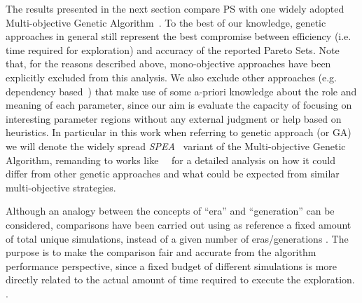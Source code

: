 The results presented in the next section compare PS with one widely
adopted Multi-objective Genetic Algorithm~\cite{knowles_techrep06}. To
the best of our knowledge, genetic approaches in general still
represent the best compromise between efficiency (i.e. time required
for exploration) and accuracy of the reported Pareto Sets.  Note that,
for the reasons described above, mono-objective approaches have been
explicitly excluded from this analysis.  We also exclude other
approaches (e.g.  dependency based~\cite{givargis_tvlsi02}) that make
use of some a-priori knowledge about the role and meaning of each
parameter, since our aim is evaluate the capacity of focusing on
interesting parameter regions without any external judgment or help
based on heuristics.  In particular in this work when referring to
genetic approach (or GA) we will denote the widely spread 
\emph{SPEA}~\cite{zitzler_eurogen01} variant of the Multi-objective
Genetic Algorithm, remanding to
works like~\cite{zitzler_ec00}~\cite{zitzler_tec03} for a detailed
analysis on how it could differ from other genetic approaches and what
could be expected from similar multi-objective strategies. 

Although an analogy between the concepts of ``era'' and ``generation''
can be considered, comparisons have been carried out using as
reference a fixed amount of total unique simulations, instead of a given
number of eras/generations . The purpose is to make the comparison
fair and accurate from the algorithm performance perspective, since a fixed budget of
different simulations is more directly related to the actual amount of time
required to execute the exploration.
.

